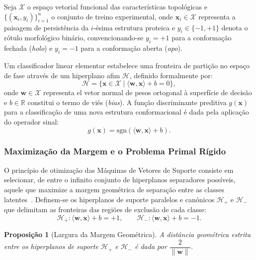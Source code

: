 \documentclass[12pt, a4paper]{article}
\newtheorem{proposition}{Proposição}
\begin{document}
Seja $\mathcal{X}$ o espaço vetorial funcional das características topológicas e $\{(\mathbf{x}_i, y_i)\}_{i=1}^n$ o conjunto de treino experimental, onde $\mathbf{x}_i \in \mathcal{X}$ representa a paisagem de persistência da $i$-ésima estrutura proteica e $y_i \in \{-1, +1\}$ denota o rótulo morfológico binário, convencionando-se $y_i = +1$ para a conformação fechada (\textit{holo}) e $y_i = -1$ para a conformação aberta (\textit{apo}).

Um classificador linear elementar estabelece uma fronteira de partição no espaço de fase através de um hiperplano afim $\mathcal{H}$, definido formalmente por:
\begin{equation}\label{eq:hiperplano}
\mathcal{H} = \{\mathbf{x} \in \mathcal{X} \mid \langle \mathbf{w}, \mathbf{x} \rangle + b = 0\},
\end{equation}
onde $\mathbf{w} \in \mathcal{X}$ representa el vetor normal de pesos ortogonal à superfície de decisão e $b \in \mathbb{R}$ constitui o termo de viés (\textit{bias}). A função discriminante preditiva $g(\mathbf{x})$ para a classificação de uma nova estrutura conformacional é dada pela aplicação do operador sinal:
\begin{equation}\label{eq:decisao}
g(\mathbf{x}) = \mathrm{sgn}\left(\langle \mathbf{w}, \mathbf{x} \rangle + b\right).
\end{equation}

\subsubsection{Maximização da Margem e o Problema Primal Rígido}

O princípio de otimização das Máquinas de Vetores de Suporte consiste em selecionar, de entre o infinito conjunto de hiperplanos separadores possíveis, aquele que maximize a margem geométrica de separação entre as classes latentes~\cite{Cortes1995}. Definem-se os hiperplanos de suporte paralelos e canónicos $\mathcal{H}_+$ e $\mathcal{H}_-$ que delimitam as fronteiras das regiões de exclusão de cada classe:
\[
\mathcal{H}_+ : \langle \mathbf{w}, \mathbf{x} \rangle + b = +1, \qquad \mathcal{H}_- : \langle \mathbf{w}, \mathbf{x} \rangle + b = -1.
\]

\begin{proposition}[Largura da Margem Geométrica]
A distância geométrica estrita entre os hiperplanos de suporte $\mathcal{H}_+$ e $\mathcal{H}_-$ é dada por $\dfrac{2}{\|\mathbf{w}\|}$.
\end{proposition}
\end{document}
